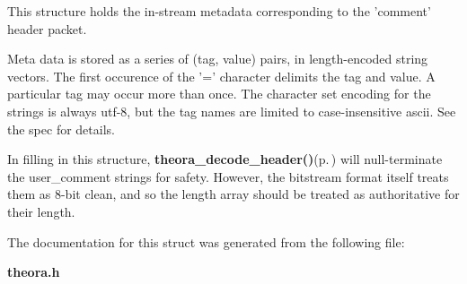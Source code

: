 This structure holds the in-stream metadata corresponding to the 'comment' header packet.

Meta data is stored as a series of (tag, value) pairs, in length-encoded string vectors. The first occurence of the '=' character delimits the tag and value. A particular tag may occur more than once. The character set encoding for the strings is always utf-8, but the tag names are limited to case-insensitive ascii. See the spec for details.

In filling in this structure, {\bf theora\_\-decode\_\-header()}{\rm (p.\,\pageref{theora_8h_41a60c67649c41ae88278d777f89ee3f})} will null-terminate the user\_\-comment strings for safety. However, the bitstream format itself treats them as 8-bit clean, and so the length array should be treated as authoritative for their length. 



The documentation for this struct was generated from the following file:\begin{CompactItemize}
\item 
{\bf theora.h}\end{CompactItemize}
